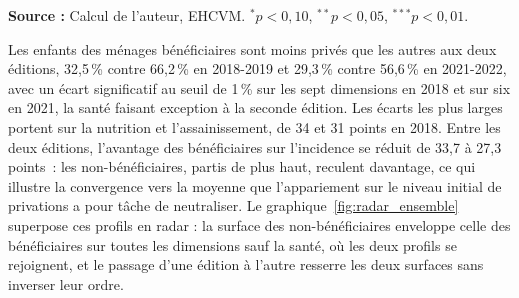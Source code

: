 \begin{table}[H]
  \centering
  \caption{Taux de privation par dimension selon le statut de bénéficiaire, ensemble des enfants (\%)}
  \label{tab:comparaison_benef}
  \zebre
  \small

  {\footnotesize \textbf{Source :} Calcul de l'auteur, EHCVM. $^{*}p<0{,}10$, $^{**}p<0{,}05$, $^{***}p<0{,}01$.}
\end{table}

Les enfants des ménages bénéficiaires sont moins privés que les autres aux
deux éditions, 32,5\,\% contre 66,2\,\% en 2018-2019 et 29,3\,\% contre
56,6\,\% en 2021-2022, avec un écart significatif au seuil de 1\,\% sur
les sept dimensions en 2018 et sur six en 2021, la santé faisant exception
à la seconde édition. Les écarts les plus larges portent sur la nutrition
et l'assainissement, de 34 et 31 points en 2018. Entre les deux éditions,
l'avantage des bénéficiaires sur l'incidence se réduit de 33,7 à 27,3
points~: les non-bénéficiaires, partis de plus haut, reculent davantage,
ce qui illustre la convergence vers la moyenne que l'appariement sur le
niveau initial de privations a pour tâche de neutraliser. Le
graphique~\ref{fig:radar_ensemble} superpose ces profils en radar : la
surface des non-bénéficiaires enveloppe celle des bénéficiaires sur
toutes les dimensions sauf la santé, où les deux profils se rejoignent,
et le passage d'une édition à l'autre resserre les deux surfaces sans
inverser leur ordre.

